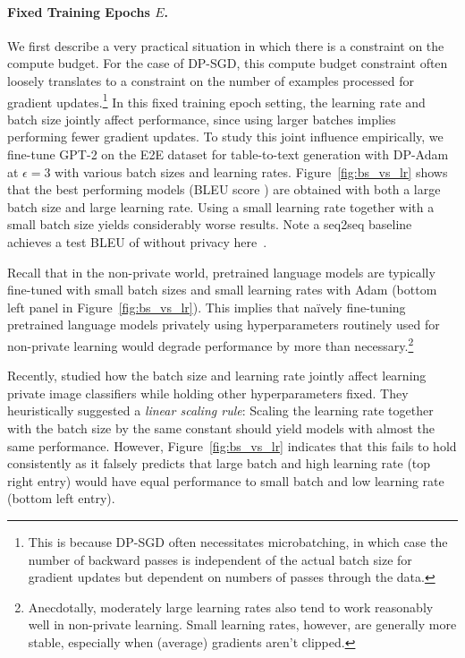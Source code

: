 \paragraph{Fixed Training Epochs $E$.}
We first describe a very practical situation in which there is a constraint on the compute budget.
For the case of DP-SGD, this compute budget constraint often loosely translates to a constraint on the number of examples processed for gradient updates.\footnote{This is because DP-SGD often necessitates microbatching, in which case the number of backward passes is independent of the actual batch size for gradient updates but dependent on numbers of passes through the data.} 
In this fixed training epoch setting, the learning rate and batch size jointly affect performance, since using larger batches implies performing fewer gradient updates. 
To study this joint influence empirically, we fine-tune GPT-2 on the E2E dataset for table-to-text generation with DP-Adam at $\epsilon=3$ with various batch sizes and learning rates. 
Figure~\ref{fig:bs_vs_lr} shows that the best performing models (BLEU score )
are obtained with both a large batch size and large learning rate. 
Using a small learning rate together with a small batch size yields considerably worse results. 
Note a seq2seq baseline achieves a test 
BLEU of  without privacy here~\citep{wiseman2018learning}. 

Recall that in the non-private world, pretrained language models are typically fine-tuned with small batch sizes and small learning rates with Adam (bottom left panel in Figure~\ref{fig:bs_vs_lr}).
This implies that na\"ively fine-tuning pretrained language models privately using hyperparameters routinely used for non-private learning would degrade performance by more than necessary.\footnote{Anecdotally, moderately large learning rates also tend to work reasonably well in non-private learning. Small learning rates, however, are generally more stable, especially when (average) gradients aren't clipped.}

Recently, \cite{tramer2020differentially} studied how the batch size and learning rate jointly affect learning private image classifiers while holding other hyperparameters fixed.
They heuristically suggested a \textit{linear scaling rule}: Scaling the learning rate together with the batch size by the same constant should yield models with almost the same performance. 
However, Figure~\ref{fig:bs_vs_lr} indicates that this fails to hold consistently as it falsely predicts that large batch and high learning rate (top right entry) would have equal performance to small batch and low learning rate (bottom left entry).

